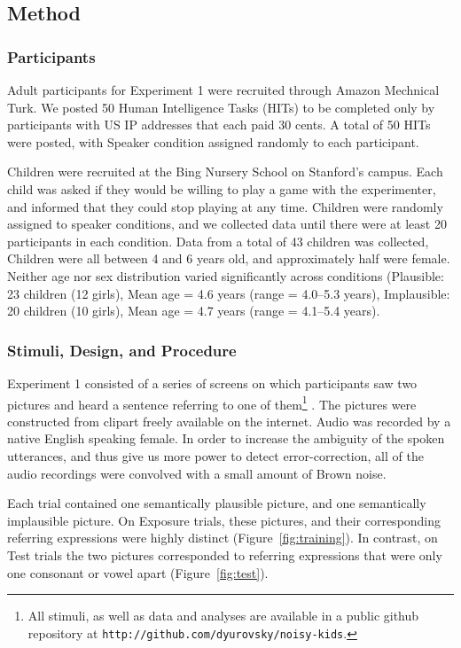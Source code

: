 \documentclass[man,floatsintext]{apa6}
\begin{document}
\subsection{Method}
\subsubsection{Participants}

Adult participants for Experiment 1 were recruited through Amazon Mechnical Turk. We posted 50 Human Intelligence Tasks (HITs) to be completed only by participants with US IP addresses that each paid 30 cents. A total of 50 HITs were posted, with Speaker condition assigned randomly to each participant.

Children were recruited at the Bing Nursery School on Stanford's campus. Each child was asked if they would be willing to play a game with the experimenter, and informed that they could stop playing at any time. Children were randomly assigned to speaker conditions, and we collected data until there were at least 20 participants in each condition. Data from a total of 43 children was collected, Children were all between 4 and 6 years old, and approximately half were female. Neither age nor sex distribution varied significantly across conditions (Plausible: 23 children (12 girls), Mean age = 4.6 years (range = 4.0--5.3 years), Implausible: 20 children (10 girls), Mean age = 4.7 years (range = 4.1--5.4 years).

\subsubsection{Stimuli, Design, and Procedure}

Experiment 1 consisted of a series of screens on which participants saw two pictures and heard a sentence referring to one of them\footnote{All stimuli, as well as data and analyses are available in a public github repository at \small{\tt{http://github.com/dyurovsky/noisy-kids}}.} . The pictures were constructed from clipart freely available on the internet. Audio was recorded by a native English speaking female. In order to increase the ambiguity of the spoken utterances, and thus give us more power to detect error-correction, all of the audio recordings were convolved with a small amount of Brown noise.

Each trial contained one semantically plausible picture, and one semantically implausible picture. On Exposure trials, these pictures, and their corresponding referring expressions were highly distinct (Figure~\ref{fig:training}). In contrast, on Test trials the two pictures corresponded to referring expressions that were only one consonant or vowel apart (Figure~\ref{fig:test}).
\end{document}
